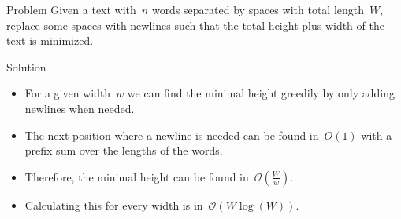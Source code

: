 \begin{slide}
	\begin{block}{Problem}
		Given a text with~$n$ words separated by spaces with total length~$W$, replace some spaces with newlines such that the total height plus width of the text is minimized.
	\end{block}
	\pause
	\begin{block}{Solution}
		\begin{itemize}
			\item For a given width~$w$ we can find the minimal height greedily by only adding newlines when needed.
			\item The next position where a newline is needed can be found in~$O(1)$ with a prefix sum over the lengths of the words.
			\item Therefore, the minimal height can be found in~$\mathcal{O}(\frac{W}{w})$.
			\pause
			\item Calculating this for every width is in~$\mathcal{O}(W\log(W))$.
		\end{itemize}
	\end{block}
\end{slide}

